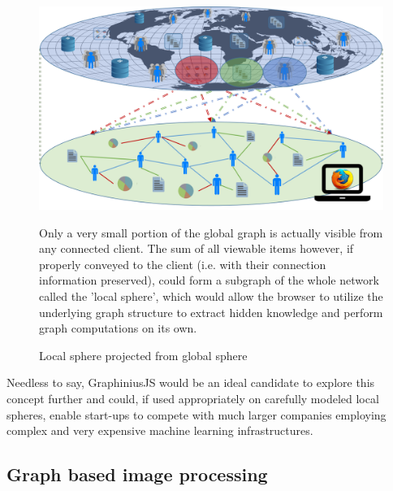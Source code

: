 	
	\begin{figure}[ht]
		\label{fig_local_sphere}
		\begin{center}
			\includegraphics[width=1\textwidth]{figures/local_sphere}
			\caption{Local sphere projected from global sphere}
		\end{center}
		\small
		Only a very small portion of the global graph is actually visible from any connected client. The sum of all viewable items however, if properly conveyed to the client (i.e. with their connection information preserved), could form a subgraph of the whole network called the 'local sphere', which would allow the browser to utilize the underlying graph structure to extract hidden knowledge and perform graph computations on its own.
	\end{figure}
	
	
	Needless to say, GraphiniusJS would be an ideal candidate to explore this concept further and could, if used appropriately on carefully modeled local spheres, enable start-ups to compete with much larger companies employing complex and very expensive machine learning infrastructures.
	
	
	
	
	
	\subsection{Graph based image processing}
	\label{ssect:app_graph_img_proc}
	
